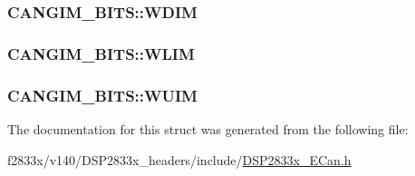 \subsubsection[{W\+D\+I\+M}]{ C\+A\+N\+G\+I\+M\+\_\+\+B\+I\+T\+S\+::\+W\+D\+I\+M}\label{struct_c_a_n_g_i_m___b_i_t_s_afc9db72696f9bd4db6d4943427d830e5}
\hypertarget{struct_c_a_n_g_i_m___b_i_t_s_aa7b72bc1a7789df13a15d943e47ed67c}{}
\subsubsection[{W\+L\+I\+M}]{ C\+A\+N\+G\+I\+M\+\_\+\+B\+I\+T\+S\+::\+W\+L\+I\+M}\label{struct_c_a_n_g_i_m___b_i_t_s_aa7b72bc1a7789df13a15d943e47ed67c}
\hypertarget{struct_c_a_n_g_i_m___b_i_t_s_a9a01cf77ca7e5f9578451cc8ae3476e7}{}
\subsubsection[{W\+U\+I\+M}]{ C\+A\+N\+G\+I\+M\+\_\+\+B\+I\+T\+S\+::\+W\+U\+I\+M}\label{struct_c_a_n_g_i_m___b_i_t_s_a9a01cf77ca7e5f9578451cc8ae3476e7}


The documentation for this struct was generated from the following file\+:\begin{DoxyCompactItemize}
\item 
f2833x/v140/\+D\+S\+P2833x\+\_\+headers/include/\hyperlink{_d_s_p2833x___e_can_8h}{D\+S\+P2833x\+\_\+\+E\+Can.\+h}\end{DoxyCompactItemize}
